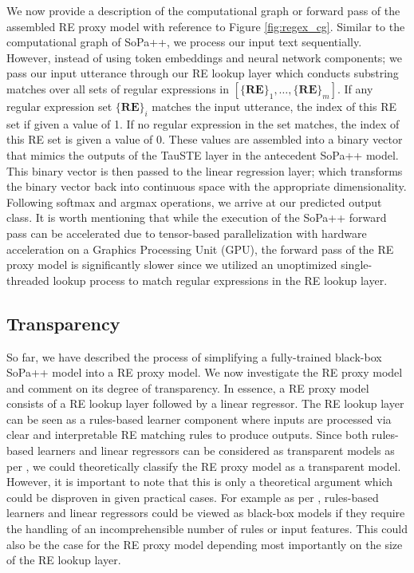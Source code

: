 We now provide a description of the computational graph or forward pass of the
assembled RE proxy model with reference to Figure \ref{fig:regex_cg}. Similar to
the computational graph of SoPa++, we process our input text sequentially.
However, instead of using token embeddings and neural network components; we
pass our input utterance through our RE lookup layer which conducts substring
matches over all sets of regular expressions in $[\{\textbf{RE}\}_1, \ldots,
\{\textbf{RE}\}_m]$. If any regular expression set $\{\textbf{RE}\}_i$ matches
the input utterance, the index of this RE set if given a value of 1. If no
regular expression in the set matches, the index of this RE set is given a value
of 0. These values are assembled into a binary vector that mimics the outputs of
the TauSTE layer in the antecedent SoPa++ model. This binary vector is then
passed to the linear regression layer; which transforms the binary vector back
into continuous space with the appropriate dimensionality. Following softmax and
argmax operations, we arrive at our predicted output class. It is worth
mentioning that while the execution of the SoPa++ forward pass can be
accelerated due to tensor-based parallelization with hardware acceleration on a
Graphics Processing Unit (GPU), the forward pass of the RE proxy model is
significantly slower since we utilized an unoptimized single-threaded lookup
process to match regular expressions in the RE lookup layer.

\subsection{Transparency}

\label{section:re_transparency}

So far, we have described the process of simplifying a fully-trained black-box
SoPa++ model into a RE proxy model. We now investigate the RE proxy model and
comment on its degree of transparency. In essence, a RE proxy model consists of
a RE lookup layer followed by a linear regressor. The RE lookup layer can be
seen as a rules-based learner component where inputs are processed via clear and
interpretable RE matching rules to produce outputs. Since both rules-based
learners and linear regressors can be considered as transparent models as per
\citet[Page 7, Section 3]{arrieta2020explainable}, we could theoretically
classify the RE proxy model as a transparent model. However, it is important to
note that this is only a theoretical argument which could be disproven in given
practical cases. For example as per \citet[Page 9, Table
2]{arrieta2020explainable}, rules-based learners and linear regressors could be
viewed as black-box models if they require the handling of an incomprehensible
number of rules or input features. This could also be the case for the RE proxy
model depending most importantly on the size of the RE lookup layer.

